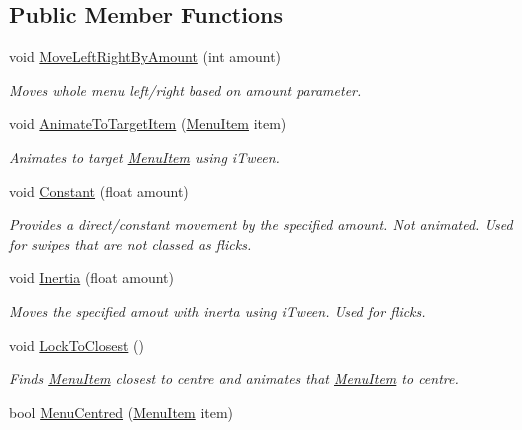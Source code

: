 \subsection*{Public Member Functions}
\begin{DoxyCompactItemize}
\item 
void \hyperlink{class_swipe_menu_1_1_menu_a1cd5f6afccbcdda68fc4c956567a808c}{Move\+Left\+Right\+By\+Amount} (int amount)
\begin{DoxyCompactList}\small\item\em Moves whole menu left/right based on amount parameter. \end{DoxyCompactList}\item 
void \hyperlink{class_swipe_menu_1_1_menu_a03292635acd952897d0f5d071975bcc0}{Animate\+To\+Target\+Item} (\hyperlink{class_swipe_menu_1_1_menu_item}{Menu\+Item} item)
\begin{DoxyCompactList}\small\item\em Animates to target \hyperlink{class_swipe_menu_1_1_menu_item}{Menu\+Item} using i\+Tween. \end{DoxyCompactList}\item 
void \hyperlink{class_swipe_menu_1_1_menu_a943c7579e8041947c18e0b13afd3ceb3}{Constant} (float amount)
\begin{DoxyCompactList}\small\item\em Provides a direct/constant movement by the specified amount. Not animated. Used for swipes that are not classed as flicks. \end{DoxyCompactList}\item 
void \hyperlink{class_swipe_menu_1_1_menu_a406762bcd1f748050fdd5dadeb79dc0d}{Inertia} (float amount)
\begin{DoxyCompactList}\small\item\em Moves the specified amout with inerta using i\+Tween. Used for flicks. \end{DoxyCompactList}\item 
void \hyperlink{class_swipe_menu_1_1_menu_a274e182f19d94eae667faf9eb0f4d276}{Lock\+To\+Closest} ()
\begin{DoxyCompactList}\small\item\em Finds \hyperlink{class_swipe_menu_1_1_menu_item}{Menu\+Item} closest to centre and animates that \hyperlink{class_swipe_menu_1_1_menu_item}{Menu\+Item} to centre. \end{DoxyCompactList}\item 
bool \hyperlink{class_swipe_menu_1_1_menu_ae716a1b8cf270e71c3055be494823928}{Menu\+Centred} (\hyperlink{class_swipe_menu_1_1_menu_item}{Menu\+Item} item)

\end{DoxyCompactItemize}
